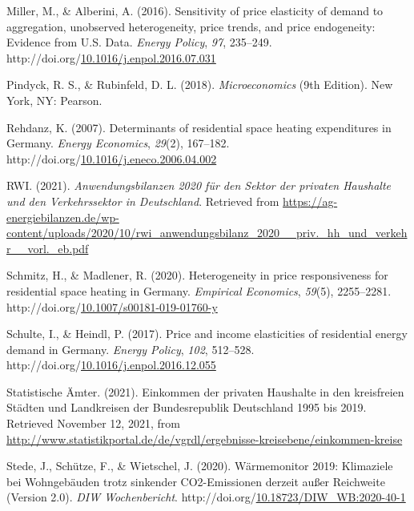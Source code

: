 \documentclass[12pt,twoside]{reedthesis}
\newlength{\cslhangindent}
\newenvironment{CSLReferences}[2] %
 {%
  \setlength{\parindent}{0pt}
  \ifodd #1 \everypar{\setlength{\hangindent}{\cslhangindent}}\ignorespaces\fi
  \ifnum #2 > 0
  \setlength{\parskip}{#2\baselineskip}
  \fi
 }%
 {}
\begin{document}
\begin{CSLReferences}{1}{0}
\leavevmode{}%
Miller, M., \& Alberini, A. (2016). Sensitivity of price elasticity of demand to aggregation, unobserved heterogeneity, price trends, and price endogeneity: Evidence from U.S. Data. \emph{Energy Policy}, \emph{97}, 235--249. http://doi.org/\href{https://doi.org/10.1016/j.enpol.2016.07.031}{10.1016/j.enpol.2016.07.031}

\leavevmode{}%
Pindyck, R. S., \& Rubinfeld, D. L. (2018). \emph{Microeconomics} (9th Edition). New York, NY: Pearson.

\leavevmode{}%
Rehdanz, K. (2007). Determinants of residential space heating expenditures in Germany. \emph{Energy Economics}, \emph{29}(2), 167--182. http://doi.org/\href{https://doi.org/10.1016/j.eneco.2006.04.002}{10.1016/j.eneco.2006.04.002}

\leavevmode{}%
RWI. (2021). \emph{Anwendungsbilanzen 2020 für den Sektor der privaten Haushalte und den Verkehrssektor in Deutschland}. Retrieved from \url{https://ag-energiebilanzen.de/wp-content/uploads/2020/10/rwi_anwendungsbilanz_2020__priv._hh_und_verkehr__vorl._eb.pdf}

\leavevmode{}%
Schmitz, H., \& Madlener, R. (2020). Heterogeneity in price responsiveness for residential space heating in Germany. \emph{Empirical Economics}, \emph{59}(5), 2255--2281. http://doi.org/\href{https://doi.org/10.1007/s00181-019-01760-y}{10.1007/s00181-019-01760-y}

\leavevmode{}%
Schulte, I., \& Heindl, P. (2017). Price and income elasticities of residential energy demand in Germany. \emph{Energy Policy}, \emph{102}, 512--528. http://doi.org/\href{https://doi.org/10.1016/j.enpol.2016.12.055}{10.1016/j.enpol.2016.12.055}

\leavevmode{}%
Statistische Ämter. (2021). Einkommen der privaten Haushalte in den kreisfreien Städten und Landkreisen der Bundesrepublik Deutschland 1995 bis 2019. Retrieved November 12, 2021, from \url{http://www.statistikportal.de/de/vgrdl/ergebnisse-kreisebene/einkommen-kreise}

\leavevmode{}%
Stede, J., Schütze, F., \& Wietschel, J. (2020). Wärmemonitor 2019: Klimaziele bei Wohngebäuden trotz sinkender CO2-Emissionen derzeit außer Reichweite (Version 2.0). \emph{DIW Wochenbericht}. http://doi.org/\href{https://doi.org/10.18723/DIW_WB:2020-40-1}{10.18723/DIW\_WB:2020-40-1}


\end{CSLReferences}
\end{document}
